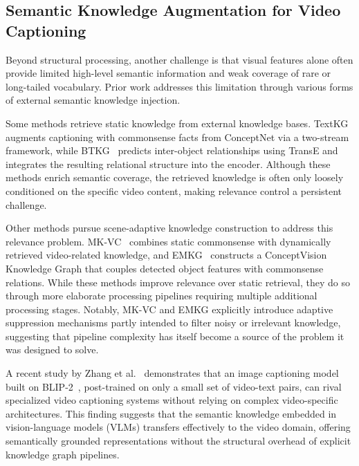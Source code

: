 \subsection{Semantic Knowledge Augmentation for Video Captioning}

Beyond structural processing, another challenge is that visual features alone often provide limited high-level semantic information and weak coverage of rare or long-tailed vocabulary. Prior work addresses this limitation through various forms of external semantic knowledge injection.

Some methods retrieve static knowledge from external knowledge bases. TextKG~\cite{guTextKnowledgeGraph2023} augments captioning with commonsense facts from ConceptNet via a two-stream framework, while BTKG~\cite{zhongBidirectionalTransformerKnowledge2024} predicts inter-object relationships using TransE and integrates the resulting relational structure into the encoder. Although these methods enrich semantic coverage, the retrieved knowledge is often only loosely conditioned on the specific video content, making relevance control a persistent challenge.

Other methods pursue scene-adaptive knowledge construction to address this relevance problem. MK-VC~\cite{sunSceneAdaptiveDynamic2026} combines static commonsense with dynamically retrieved video-related knowledge, and EMKG~\cite{sunGeneralizedVideoCaptioning2026} constructs a ConceptVision Knowledge Graph that couples detected object features with commonsense relations. While these methods improve relevance over static retrieval, they do so through more elaborate processing pipelines requiring multiple additional processing stages. Notably, MK-VC and EMKG explicitly introduce adaptive suppression mechanisms partly intended to filter noisy or irrelevant knowledge, suggesting that pipeline complexity has itself become a source of the problem it was designed to solve.

A recent study by Zhang et al.~\cite{zhangPretrainedImageTextModels2025} demonstrates that an image captioning model built on \mbox{BLIP-2~\cite{liBLIP2BootstrappingLanguageImage2023}}, post-trained on only a small set of video-text pairs, can rival specialized video captioning systems without relying on complex video-specific architectures. This finding suggests that the semantic knowledge embedded in vision-language models (VLMs) transfers effectively to the video domain, offering semantically grounded representations without the structural overhead of explicit knowledge graph pipelines.


